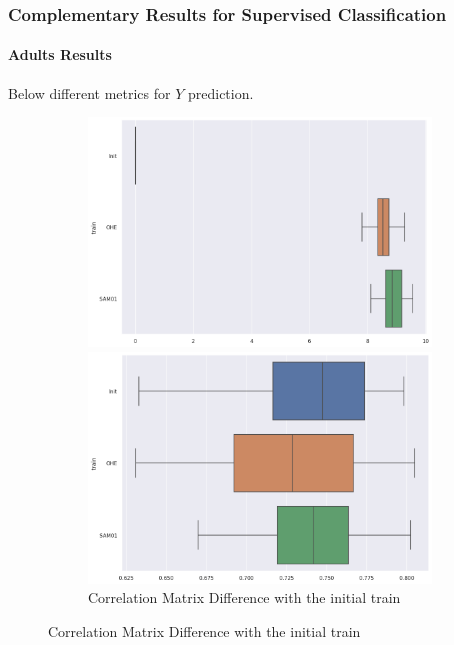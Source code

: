 \documentclass{article}
\theoremstyle{definition}
\begin{document}
\newpage
\subsubsection{Complementary Results for Supervised Classification}
\label{Prediction_Classification_Details}

\paragraph{Adults Results} Below different metrics for $Y$ prediction. 

\begin{figure}[H]
     \centering
     \begin{subfigure}[b]{0.24\textwidth}
         \centering
         \includegraphics[width=\textwidth]{imgs/Adults/Imb/Boxplot_MC.png}
         \caption{Correlation Matrix Difference with the initial train}
         \quad
         \includegraphics[width=\textwidth]{imgs/Adults/Imb/Boxplot_AUC.png}

\end{subfigure}
\end{figure}
\end{document}
